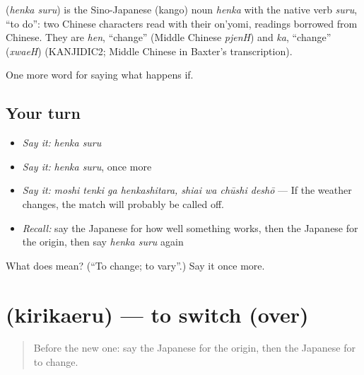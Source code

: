 \begin{cousinweb}
\textbf{} (\emph{henka suru}) is the Sino-Japanese (kango) noun \emph{henka} with the native verb \emph{suru}, \textquotedblleft{}to do\textquotedblright{}: two Chinese characters read with their on'yomi, readings borrowed from Chinese. They are \emph{hen}, \textquotedblleft{}change\textquotedblright{} (Middle Chinese \emph{pjenH}) and \emph{ka}, \textquotedblleft{}change\textquotedblright{} (\emph{xwaeH}) (KANJIDIC2; Middle Chinese in Baxter's transcription).
\end{cousinweb}

\begin{grammarlens}[title={What you've built}]
One more word for saying what happens if.
\end{grammarlens}

\subsection*{Your turn}
\begin{itemize}
\raggedright
  \item \emph{Say it:} \emph{henka suru}
  \item \emph{Say it:} \emph{henka suru}, once more
  \item \emph{Say it:} \emph{moshi tenki ga henkashitara, shiai wa chūshi deshō} — If the weather changes, the match will probably be called off.
  \item \emph{Recall:} say the Japanese for how well something works, then the Japanese for the origin, then say \emph{henka suru} again
\end{itemize}

\begin{tcolorbox}[breakable,colback=teal!4,colframe=teal!35!black,title={Before you move on}]
What does  mean? (\textquotedblleft{}To change; to vary\textquotedblright{}.) Say it once more.
\end{tcolorbox}
\section[\texorpdfstring{\ja{きりかえる} (kirikaeru)}{きりかえる (kirikaeru)}]{ (kirikaeru) — to switch (over)}

\label{lesson:JA-C512-kirikaeru}



\begin{quote}
Before the new one: say the Japanese for the origin, then the Japanese for to change.
\end{quote}

